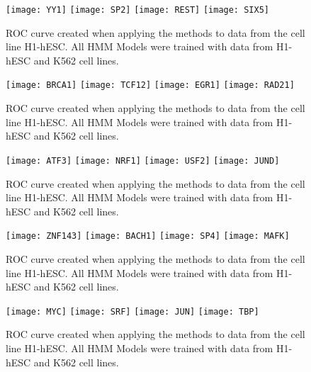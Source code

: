\documentclass[11pt,a4]{article}
\begin{document}
\begin{figure}[h]
\centering
    \texttt{[image: YY1]}
    \texttt{[image: SP2]}
    \texttt{[image: REST]}
    \texttt{[image: SIX5]}
\caption{ROC curve created when applying the methods to data from the cell line H1-hESC. All HMM Models were trained with data from H1-hESC and K562 cell lines.}
\label{fig:roc.H1hesc.1}
\end{figure}

\begin{figure}[h]
\centering
    \texttt{[image: BRCA1]}
    \texttt{[image: TCF12]}
    \texttt{[image: EGR1]}
    \texttt{[image: RAD21]}
\caption{ROC curve created when applying the methods to data from the cell line H1-hESC. All HMM Models were trained with data from H1-hESC and K562 cell lines.}
\label{fig:roc.H1hesc.2}
\end{figure}

\begin{figure}[h]
\centering
    \texttt{[image: ATF3]}
    \texttt{[image: NRF1]}
    \texttt{[image: USF2]}
    \texttt{[image: JUND]}
\caption{ROC curve created when applying the methods to data from the cell line H1-hESC. All HMM Models were trained with data from H1-hESC and K562 cell lines.}
\label{fig:roc.H1hesc.3}
\end{figure}

\begin{figure}[h]
\centering
    \texttt{[image: ZNF143]}
    \texttt{[image: BACH1]}
    \texttt{[image: SP4]}
    \texttt{[image: MAFK]}
\caption{ROC curve created when applying the methods to data from the cell line H1-hESC. All HMM Models were trained with data from H1-hESC and K562 cell lines.}
\label{fig:roc.H1hesc.4}
\end{figure}

\begin{figure}[h]
\centering
    \texttt{[image: MYC]}
    \texttt{[image: SRF]}
    \texttt{[image: JUN]}
    \texttt{[image: TBP]}
\caption{ROC curve created when applying the methods to data from the cell line H1-hESC. All HMM Models were trained with data from H1-hESC and K562 cell lines.}
\label{fig:roc.H1hesc.5}
\end{figure}
\end{document}
